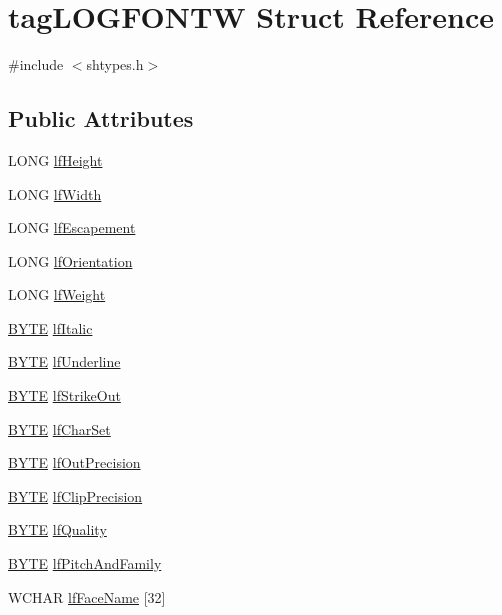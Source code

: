 \hypertarget{structtag_l_o_g_f_o_n_t_w}{}\section{tag\+L\+O\+G\+F\+O\+N\+TW Struct Reference}
\label{structtag_l_o_g_f_o_n_t_w}


{\ttfamily \#include $<$shtypes.\+h$>$}

\subsection*{Public Attributes}
\begin{DoxyCompactItemize}
\item 
L\+O\+NG \hyperlink{structtag_l_o_g_f_o_n_t_w_a9c49cb0a3c45762492bb4137e6c14eb5}{lf\+Height}
\item 
L\+O\+NG \hyperlink{structtag_l_o_g_f_o_n_t_w_a460d30beebfc7a2713374f78236d850f}{lf\+Width}
\item 
L\+O\+NG \hyperlink{structtag_l_o_g_f_o_n_t_w_ae3bec8c800604c75eb33acd84f4c7491}{lf\+Escapement}
\item 
L\+O\+NG \hyperlink{structtag_l_o_g_f_o_n_t_w_a905c539bcf06ab8276db51106160ca61}{lf\+Orientation}
\item 
L\+O\+NG \hyperlink{structtag_l_o_g_f_o_n_t_w_acab21c87df8172eb750b34d8e95a9cd3}{lf\+Weight}
\item 
\hyperlink{mapinls_8h_a4ae1dab0fb4b072a66584546209e7d58}{B\+Y\+TE} \hyperlink{structtag_l_o_g_f_o_n_t_w_abb5b796d6d143e542469733c9787d591}{lf\+Italic}
\item 
\hyperlink{mapinls_8h_a4ae1dab0fb4b072a66584546209e7d58}{B\+Y\+TE} \hyperlink{structtag_l_o_g_f_o_n_t_w_a6fec4ec4b1839f2dfb57f19d5be1066b}{lf\+Underline}
\item 
\hyperlink{mapinls_8h_a4ae1dab0fb4b072a66584546209e7d58}{B\+Y\+TE} \hyperlink{structtag_l_o_g_f_o_n_t_w_ac7c4a468e427338cba19c13eff53ae82}{lf\+Strike\+Out}
\item 
\hyperlink{mapinls_8h_a4ae1dab0fb4b072a66584546209e7d58}{B\+Y\+TE} \hyperlink{structtag_l_o_g_f_o_n_t_w_a48dfa89b5878c4424efde9d47a7273c9}{lf\+Char\+Set}
\item 
\hyperlink{mapinls_8h_a4ae1dab0fb4b072a66584546209e7d58}{B\+Y\+TE} \hyperlink{structtag_l_o_g_f_o_n_t_w_a127aaf91a023ce889e5ff95d2d354bed}{lf\+Out\+Precision}
\item 
\hyperlink{mapinls_8h_a4ae1dab0fb4b072a66584546209e7d58}{B\+Y\+TE} \hyperlink{structtag_l_o_g_f_o_n_t_w_ad46dd44f98e2b0beeab12afab51f2778}{lf\+Clip\+Precision}
\item 
\hyperlink{mapinls_8h_a4ae1dab0fb4b072a66584546209e7d58}{B\+Y\+TE} \hyperlink{structtag_l_o_g_f_o_n_t_w_a6378f3329c5a546955a672105df8bf31}{lf\+Quality}
\item 
\hyperlink{mapinls_8h_a4ae1dab0fb4b072a66584546209e7d58}{B\+Y\+TE} \hyperlink{structtag_l_o_g_f_o_n_t_w_aee0b40d69635f73372a85227e5b3bb92}{lf\+Pitch\+And\+Family}
\item 
W\+C\+H\+AR \hyperlink{structtag_l_o_g_f_o_n_t_w_a5c5f1aae8d18fa9f9f88913b80279015}{lf\+Face\+Name} \mbox{[}32\mbox{]}
\end{DoxyCompactItemize}


